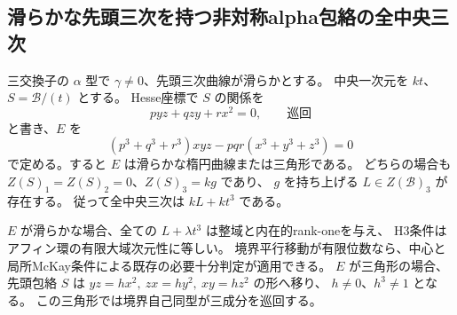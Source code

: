 \subsection{滑らかな先頭三次を持つ非対称alpha包絡の全中央三次}
\label{subsec:cubic-CY-three-alpha-smooth-boundary}

\begin{theorem}\label{thm:cubic-CY-three-alpha-smooth-boundary}
三交換子の $\alpha$ 型で $\gamma\ne0$、先頭三次曲線が滑らかとする。
中央一次元を $kt$、$S=\mathcal B/(t)$ とする。
Hesse座標で $S$ の関係を
\[
 p yz+qzy+r x^2=0,\qquad\text{巡回}
\]
と書き、$E$ を
\[
 (p^3+q^3+r^3)xyz-pqr(x^3+y^3+z^3)=0
\]
で定める。すると $E$ は滑らかな楕円曲線または三角形である。
どちらの場合も $Z(S)_1=Z(S)_2=0$、$Z(S)_3=kg$ であり、
$g$ を持ち上げる $L\in Z(\mathcal B)_3$ が存在する。
従って全中央三次は $kL+kt^3$ である。

$E$ が滑らかな場合、全ての $L+\lambda t^3$ は整域と内在的rank-oneを与え、
H3条件はアフィン環の有限大域次元性に等しい。
境界平行移動が有限位数なら、中心と局所McKay条件による既存の必要十分判定が適用できる。
$E$ が三角形の場合、先頭包絡 $S$ は
$yz=h x^2,\ zx=h y^2,\ xy=h z^2$ の形へ移り、
$h\ne0$、$h^3\ne1$ となる。
この三角形では境界自己同型が三成分を巡回する。
\end{theorem}
